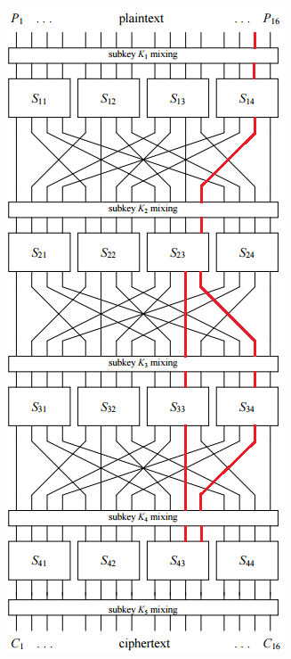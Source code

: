 \documentclass[british,11pt,a4paper]{article}
\begin{document}
\begin{appendices}
  \includegraphics{2,48}

\end{appendices}
\end{document}
